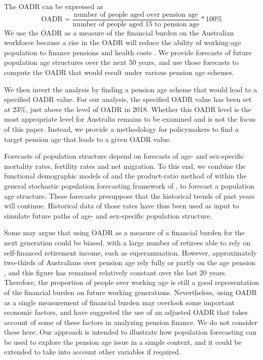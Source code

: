 \documentclass[11pt,a4paper,]{article}
\begin{document}
The OADR can be expressed as
\begin{equation}
  \text{OADR} = \frac{\text{number of people aged over pension age}}{\text{number of people aged 15 to pension age}}*100\%
\end{equation}
We use the OADR as a measure of the financial burden on the Australian workforce because a rise in the OADR will reduce the ability of working-age population to finance pensions and health costs \autocite{ARW07,IGR02,IGR07}.
We provide forecasts of future population age structures over the next 50 years, and use those forecasts to compute the OADR that would result under various pension age schemes.

We then invert the analysis by finding a pension age scheme that would lead to a specified OADR value. For our analysis, the specified OADR value has been set at 23\%, just above the level of OADR in 2018. Whether this OADR level is the most appropriate level for Australia remains to be examined and is not the focus of this paper. Instead, we provide a methodology for policymakers to find a target pension age that leads to a given OADR value.

Forecasts of population structure depend on forecasts of age- and sex-specific mortality rates, fertility rates and net migration. To this end, we combine the functional demographic models of \textcite{HU07} and the product-ratio method of \textcite{HBY13} within the general stochastic population forecasting framework of \textcite{HB08}, to forecast a population age structure. These forecasts presuppose that the historical trends of past years will continue. Historical data of those rates have thus been used as input to simulate future paths of age- and sex-specific population structure.

Some may argue that using OADR as a measure of a financial burden for the next generation could be biased, with a large number of retirees able to rely on self-financed retirement income, such as superannuation. However, approximately two-thirds of Australians over pension age rely fully or partly on the age pension \autocite{AIHW19}, and this figure has remained relatively constant over the last 20 years. Therefore, the proportion of people over working age is still a good representation of the financial burden on future working generations. Nevertheless, using OADR as a single measurement of financial burden may overlook some important economic factors, and \textcite{HY12} have suggested the use of an adjusted OADR that takes account of some of these factors in analyzing pension finance. We do not consider these here. Our approach is intended to illustrate how population forecasting can be used to explore the pension age issue in a simple context, and it could be extended to take into account other variables if required.
\end{document}

